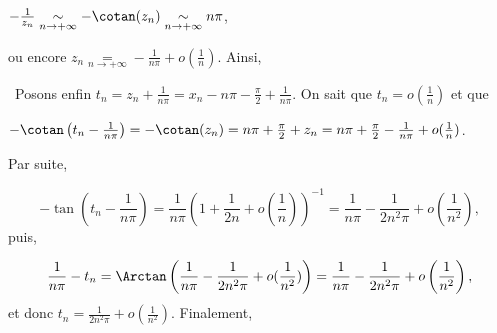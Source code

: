 {\begin{enumerate}
{\begin{center}
$-\frac{1}{z_n}\underset{n\rightarrow+\infty}{\sim}-\cotan(z_n)\underset{n\rightarrow+\infty}{\sim}n\pi$,
\end{center}
ou encore $z_n\underset{n\rightarrow+\infty}{=}-\frac{1}{n\pi}+o\left(\frac{1}{n}\right)$. Ainsi,

\begin{center}
\end{center}
\textbullet~Posons enfin $t_n=z_n+\frac{1}{n\pi}=x_n-n\pi-\frac{\pi}{2}+\frac{1}{n\pi}$. On sait que $t_n=o\left(\frac{1}{n}\right)$ et que 

\begin{center}
$-\cotan\left(t_n-\frac{1}{n\pi}\right)=-\cotan(z_n)=n\pi+\frac{\pi}{2}+z_n=n\pi+\frac{\pi}{2}-\frac{1}{n\pi}+o(\frac{1}{n})$.
\end{center} Par suite,
 
$$-\tan\left(t_n-\frac{1}{n\pi}\right)=\frac{1}{n\pi}\left(1+\frac{1}{2n}+o(\frac{1}{n})\right)^{-1}=\frac{1}{n\pi}-\frac{1}{2n^2\pi}+o\left(\frac{1}{n^2}\right),$$
puis,

$$\frac{1}{n\pi}-t_n=\Arctan\left(\frac{1}{n\pi}-\frac{1}{2n^2\pi}+o(\frac{1}{n^2})\right)=\frac{1}{n\pi}-\frac{1}{2n^2\pi}+o\left(\frac{1}{n^2}\right),$$ 
et donc $t_n=\frac{1}{2n^2\pi}+o\left(\frac{1}{n^2}\right)$. Finalement, 

\begin{center}
\end{center}
}
\end{enumerate}
}
